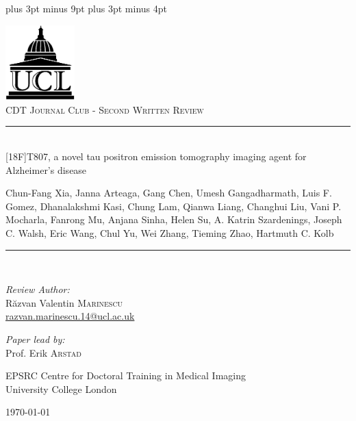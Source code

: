 \documentclass[11pt,a4paper,oneside]{report}
\begin{document}
\belowdisplayskip=12pt plus 3pt minus 9pt
\belowdisplayshortskip=7pt plus 3pt minus 4pt


\begin{titlepage}
\begin{center}

\includegraphics[width=0.2\textwidth]{ucl-logo2}~\\[1cm]


\textsc{\Large CDT Journal Club - Second Written Review}\\[0.5cm]

\newcommand{\HRule}{\rule{\linewidth}{0.5mm}}

\HRule \\[0.4cm]
{ \Large [18F]T807, a novel tau positron emission tomography imaging agent for Alzheimer's disease \\[0.4cm] }

{ \small Chun-Fang Xia, Janna Arteaga, Gang Chen, Umesh Gangadharmath, Luis F. Gomez, Dhanalakshmi Kasi, Chung Lam, Qianwa Liang, Changhui Liu, Vani P. Mocharla, Fanrong Mu, Anjana Sinha, Helen Su, A. Katrin Szardenings, Joseph C. Walsh, Eric Wang, Chul Yu, Wei Zhang, Tieming Zhao, Hartmuth C. Kolb }

\HRule \\[1.5cm]

\begin{minipage}{0.4\textwidth}
\begin{flushleft} \large
\emph{Review Author:}\\
R\u{a}zvan Valentin \textsc{Marinescu}\\
\href{razvan.marinescu.14@ucl.ac.uk}{razvan.marinescu.14@ucl.ac.uk}\\
\end{flushleft}
\end{minipage}
\begin{minipage}{0.4\textwidth}
\begin{flushright} \large
\emph{Paper lead by:} \\
Prof. Erik \textsc{Arstad}\\
\end{flushright}
\end{minipage}

\vfill

EPSRC Centre for Doctoral Training in Medical Imaging\\ University College London

\vfill

{\large \today}

\end{center}
\end{titlepage}
\end{document}

